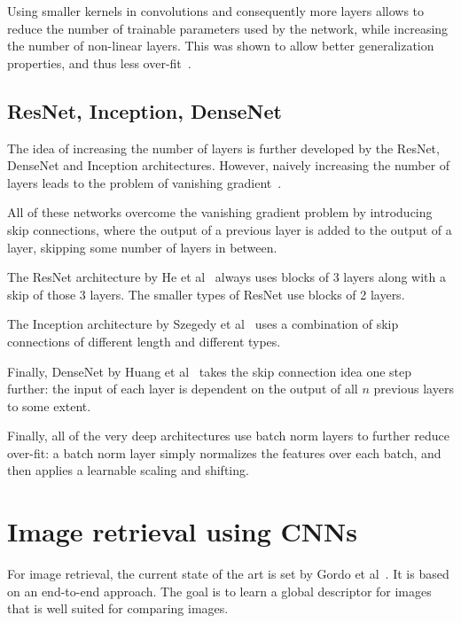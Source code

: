 Using smaller kernels in convolutions and consequently more layers
allows to reduce the number of trainable parameters used by the
network, while increasing the number of non-linear layers.
This was shown to allow better generalization properties, and thus less
over-fit~\cite{simonyan_very_2014}.

\subsection{ResNet, Inception, DenseNet}
The idea of increasing the number of layers is further developed
by the ResNet, DenseNet and Inception architectures. However,
naively increasing the number of layers leads to the problem of
vanishing gradient~\cite{hinton_fast_2006}.

All of these networks overcome the vanishing gradient problem by
introducing skip connections, where the output of a previous layer
is added to the output of a layer, skipping some number of layers in
between.

The ResNet architecture by He et al~\cite{he_deep_2015} always uses blocks
of 3 layers along with a skip of those 3 layers. The smaller types of
ResNet use blocks of 2 layers.

The Inception architecture by Szegedy et al~\cite{szegedy_inception-v4_2016}
uses a combination of skip connections of different length and different
types.

Finally, DenseNet by Huang et al~\cite{huang_densely_2016} takes the
skip connection idea one step further:
the input of each layer is dependent on the output of all $n$ previous layers
to some extent.

Finally, all of the very deep architectures use batch norm layers to further
reduce over-fit: a batch norm layer simply normalizes the features over each
batch, and then applies a learnable scaling and shifting.

\section{Image retrieval using CNNs}
For image retrieval, the current state of the art is set by
Gordo et al~\cite{gordo_deep_2016}. It is based on an
end-to-end approach. The goal is to learn a global descriptor for images
that is well suited for comparing images.

